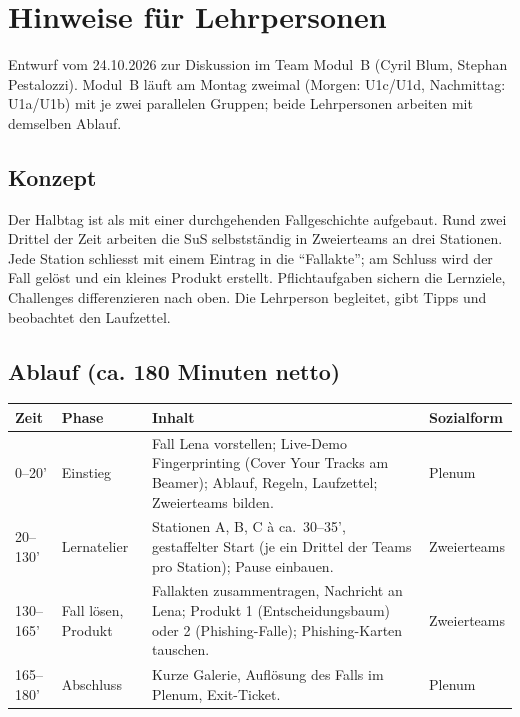 \chapter{Hinweise für Lehrpersonen}\label{app:lehrpersonen}

\begin{myremark}
	Entwurf vom 24.10.2026 zur Diskussion im Team Modul~B (Cyril Blum, Stephan Pestalozzi).
	Modul~B läuft am Montag zweimal (Morgen: U1c/U1d, Nachmittag: U1a/U1b) mit je zwei parallelen Gruppen;
	beide Lehrpersonen arbeiten mit demselben Ablauf.
\end{myremark}

\section{Konzept}

Der Halbtag ist als  mit einer durchgehenden Fallgeschichte aufgebaut.
Rund zwei Drittel der Zeit arbeiten die SuS selbstständig in Zweierteams an drei Stationen.
Jede Station schliesst mit einem Eintrag in die \enquote{Fallakte}; am Schluss wird der Fall gelöst und ein kleines Produkt erstellt.
Pflichtaufgaben sichern die Lernziele, Challenges differenzieren nach oben.
Die Lehrperson begleitet, gibt Tipps und beobachtet den Laufzettel.

\section{Ablauf (ca. 180 Minuten netto)}

\begin{center}
	\renewcommand{\arraystretch}{1.35}
	\begin{tabular}{p{1.9cm}p{3.4cm}p{6.4cm}p{2.4cm}}
		\textbf{Zeit}  & \textbf{Phase}           & \textbf{Inhalt}                                                                                                                    & \textbf{Sozialform} \\
		\midrule
		0--20'         & Einstieg                 & Fall Lena vorstellen; Live-Demo Fingerprinting (Cover Your Tracks am Beamer); Ablauf, Regeln, Laufzettel; Zweierteams bilden.       & Plenum              \\
		20--130'       & Lernatelier              & Stationen A, B, C à ca.\ 30--35', gestaffelter Start (je ein Drittel der Teams pro Station); Pause einbauen.                          & Zweierteams         \\
		130--165'      & Fall lösen, Produkt      & Fallakten zusammentragen, Nachricht an Lena; Produkt 1 (Entscheidungsbaum) oder 2 (Phishing-Falle); Phishing-Karten tauschen.       & Zweierteams         \\
		165--180'      & Abschluss                & Kurze Galerie, Auflösung des Falls im Plenum, Exit-Ticket.                                                                          & Plenum              \\
	\end{tabular}
\end{center}

